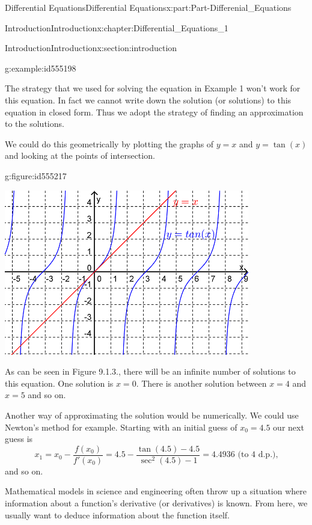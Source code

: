 \documentclass[oneside,10pt,]{book}
\numberwithin{equation}{section}
\begin{document}
\begin{partptx}{Differential Equations}{}{Differential Equations}{}{}{x:part:Part-Differenial_Equations}
\begin{chapterptx}{Introduction}{}{Introduction}{}{}{x:chapter:Differential_Equations_1}
\begin{sectionptx}{Introduction}{}{Introduction}{}{}{x:section:introduction}
\begin{example}{}{g:example:id555198}
%
\par\smallskip%
\noindent\hypertarget{g:solution:id555205}{}The strategy that we used for solving the equation in Example 1 won’t work for this equation. In fact we cannot write down the solution (or solutions) to this equation in closed form. Thus we adopt the strategy of finding an approximation to the solutions.%
\par
We could do this geometrically by plotting the graphs of \(y=x\) and \(y=\tan(x)\) and looking at the points of intersection. \begin{figureptx}{}{g:figure:id555217}{}%
\begin{image}{0.125}{0.75}{0.125}%
\includegraphics[width=\linewidth]{./DifferentialEquations/Images/1/1_example2.png}
\end{image}%
\tcblower
\end{figureptx}%
 As can be seen in Figure 9.1.3., there will be an infinite number of solutions to this equation. One solution is \(x=0\). There is another solution between \(x=4\) and \(x=5\) and so on.%
\par
Another way of approximating the solution would be numerically. We could use Newton’s method for example. Starting with an initial guess of \(x_0=4.5\) our next guess is%
\begin{equation*}
x_1=x_0-\frac{f(x_0)}{f'(x_0)}=4.5-\frac{\tan(4.5)-4.5}{\sec^2(4.5)-1}=4.4936 \textrm{ (to 4 d.p.)}\text{,}
\end{equation*}
and so on.%
\end{example}
Mathematical models in science and engineering often throw up a situation where information about a function's derivative (or derivatives) is known. From here, we usually want to deduce information about the function itself.%

\end{sectionptx}
\end{chapterptx}
\end{partptx}
\end{document}
